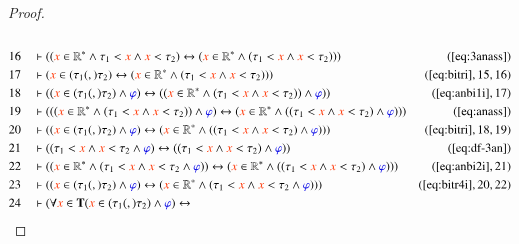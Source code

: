 \begin{proof}
\begin{align}
  \\ 16 &&  & \vdash ( ( \msc{x} \in \mathbb{R}^{\ast} \wedge \tau_1 < \msc{x}
      \wedge \msc{x} < \tau_2 ) \leftrightarrow ( \msc{x}
      \in \mathbb{R}^{\ast} \wedge ( \tau_1 < \msc{x} \wedge
      \msc{x} < \tau_2 ) ) )&(\mbox{\ref{eq:3anass}})\notag
  \\ 17 &&  & \vdash ( \msc{x} \in ( \tau_1 (,) \tau_2 ) \leftrightarrow (
      \msc{x} \in \mathbb{R}^{\ast} \wedge ( \tau_1 < \msc{x}
      \wedge \msc{x} < \tau_2 ) )
      )&(\mbox{\ref{eq:bitri}},15,16)\notag
  \\ 18 &&  & \vdash ( ( \msc{x} \in ( \tau_1 (,) \tau_2 ) \wedge \mw{\varphi}
      ) \leftrightarrow ( ( \msc{x} \in \mathbb{R}^{\ast}
      \wedge ( \tau_1 < \msc{x} \wedge \msc{x} < \tau_2 ) )
      \wedge \mw{\varphi} )
      )&(\mbox{\ref{eq:anbi1i}},17)\notag
  \\ 19 &&  & \vdash ( ( ( \msc{x} \in \mathbb{R}^{\ast} \wedge ( \tau_1 < \msc{x}
      \wedge \msc{x} < \tau_2 ) ) \wedge \mw{\varphi} )
      \leftrightarrow ( \msc{x} \in \mathbb{R}^{\ast} \wedge (
      ( \tau_1 < \msc{x} \wedge \msc{x} < \tau_2 ) \wedge
      \mw{\varphi} ) ) )&(\mbox{\ref{eq:anass}})\notag
  \\ 20 &&  & \vdash ( ( \msc{x} \in ( \tau_1 (,) \tau_2 ) \wedge \mw{\varphi}
      ) \leftrightarrow ( \msc{x} \in \mathbb{R}^{\ast} \wedge
      ( ( \tau_1 < \msc{x} \wedge \msc{x} < \tau_2 ) \wedge
      \mw{\varphi} ) )
      )&(\mbox{\ref{eq:bitri}},18,19)\notag
  \\ 21 &&  & \vdash ( ( \tau_1 < \msc{x} \wedge \msc{x} < \tau_2 \wedge
      \mw{\varphi} ) \leftrightarrow ( ( \tau_1 < \msc{x}
      \wedge \msc{x} < \tau_2 ) \wedge \mw{\varphi} )
      )&(\mbox{\ref{eq:df-3an}})\notag
  \\ 22 &&  & \vdash ( ( \msc{x} \in \mathbb{R}^{\ast} \wedge ( \tau_1 < \msc{x}
      \wedge \msc{x} < \tau_2 \wedge \mw{\varphi} ) )
      \leftrightarrow ( \msc{x} \in \mathbb{R}^{\ast} \wedge (
      ( \tau_1 < \msc{x} \wedge \msc{x} < \tau_2 ) \wedge
      \mw{\varphi} ) ) )&(\mbox{\ref{eq:anbi2i}},21)\notag
  \\ 23 &&  & \vdash ( ( \msc{x} \in ( \tau_1 (,) \tau_2 ) \wedge \mw{\varphi}
      ) \leftrightarrow ( \msc{x} \in \mathbb{R}^{\ast} \wedge
      ( \tau_1 < \msc{x} \wedge \msc{x} < \tau_2 \wedge
      \mw{\varphi} ) )
      )&(\mbox{\ref{eq:bitr4i}},20,22)\notag
  \\ 24 &&  & \vdash ( \forall \msc{x} \in \mathbf{T} ( \msc{x} \in ( \tau_1
      (,) \tau_2 ) \wedge \mw{\varphi} ) \leftrightarrow

\end{align}
\end{proof}
